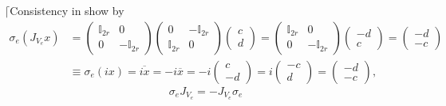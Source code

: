 \documentclass[aps,preprint]{revtex4}
\begin{document}
$\lceil$Consistency in show by 
\begin{align}
\sigma_{e}\left( J_{V_{e}}x\right) & =\left( 
\begin{array}{cc}
\mathbb{I}_{2r} & 0 \\ 
0 & -\mathbb{I}_{2r}%
\end{array}
\right) \left( 
\begin{array}{cc}
0 & -\mathbb{I}_{2r} \\ 
\mathbb{I}_{2r} & 0%
\end{array}
\right) \left( 
\begin{array}{c}
c \\ 
d%
\end{array}
\right) =\left( 
\begin{array}{cc}
\mathbb{I}_{2r} & 0 \\ 
0 & -\mathbb{I}_{2r}%
\end{array}
\right) \left( 
\begin{array}{c}
-d \\ 
c%
\end{array}
\right) =\left( 
\begin{array}{c}
-d \\ 
-c%
\end{array}
\right) \\
& \equiv\sigma_{e}\left( ix\right) =\overline{ix}=-i\overline{x}=-i\left( 
\begin{array}{c}
c \\ 
-d%
\end{array}
\right) =i\left( 
\begin{array}{c}
-c \\ 
d%
\end{array}
\right) =\left( 
\begin{array}{c}
-d \\ 
-c%
\end{array}
\right) ,
\end{align}%
\begin{equation}
\sigma_{e}J_{V_{e}}=-J_{V_{e}}\sigma_{e}
\end{equation}%
\end{document}
